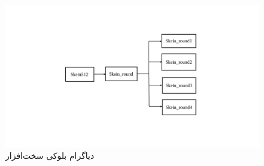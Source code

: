 \begin{figure}[H]
	\centering
	\includegraphics[width = \textwidth]{figs/DescriptionOfSystem/block_diagram.jpg}
	\caption{دیاگرام بلوکی سخت‌افزار}
	\label{block_diagram}
\end{figure}
